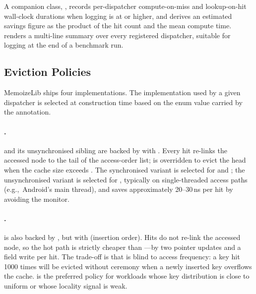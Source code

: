 A companion class, , records per-dispatcher compute-on-miss and lookup-on-hit wall-clock durations when logging is at  or higher, and derives an estimated savings figure as the product of the hit count and the mean compute time.  renders a multi-line summary over every registered dispatcher, suitable for logging at the end of a benchmark run.

\subsection{Eviction Policies}\label{sec:policies}

MemoizeLib ships four  implementations. The implementation used by a given dispatcher is selected at construction time based on the  enum value carried by the annotation.

\paragraph{\lru.}  and its unsynchronised sibling  are backed by  with . Every hit re-links the accessed node to the tail of the access-order list;  is overridden to evict the head when the cache size exceeds . The synchronised variant is selected for  and ; the unsynchronised variant is selected for , typically on single-threaded access paths (e.g.,\ Android's main thread), and saves approximately 20--30\,ns per hit by avoiding the monitor.

\paragraph{\fifo.}  is also backed by , but with  (insertion order). Hits do not re-link the accessed node, so the hot path is strictly cheaper than \lru---by two pointer updates and a field write per hit. The trade-off is that \fifo is blind to access frequency: a key hit 1000 times will be evicted without ceremony when a newly inserted key overflows the cache. \fifo is the preferred policy for workloads whose key distribution is close to uniform or whose locality signal is weak.

